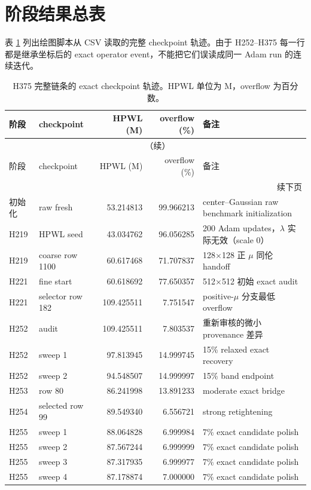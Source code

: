 \documentclass[UTF8,a4paper,11pt]{ctexrep}
\begin{document}
\section{阶段结果总表}
表 \ref{tab:trajectory} 列出绘图脚本从 CSV 读取的完整 checkpoint 轨迹。由于 H252--H375
每一行都是继承坐标后的 exact operator event，不能把它们误读成同一 Adam run 的连续迭代。

\begin{longtable}{p{1.35cm}p{2.45cm}r r p{5.6cm}}
\caption{H375 完整链条的 exact checkpoint 轨迹。HPWL 单位为 M，overflow 为百分数。}\label{tab:trajectory}\\
\toprule
阶段 & checkpoint & HPWL (M) & overflow (\%) & 备注\\
\midrule
\endfirsthead
\multicolumn{5}{c}{\tablename\ \thetable{}（续）}\\
\toprule
阶段 & checkpoint & HPWL (M) & overflow (\%) & 备注\\
\midrule
\endhead
\midrule
\multicolumn{5}{r}{续下页}\\
\endfoot
\bottomrule
\endlastfoot
初始化 & raw fresh & 53.214813 & 99.966213 & center--Gaussian raw benchmark initialization\\
H219 & HPWL seed & 43.034762 & 96.056285 & 200 Adam updates，$\lambda$ 实际无效（scale 0）\\
H219 & coarse row 1100 & 60.617468 & 71.707837 & 128$\times$128 正 $\mu$ 同伦 handoff\\
H221 & fine start & 60.618692 & 77.650357 & 512$\times$512 初始 exact audit\\
H221 & selector row 182 & 109.425511 & 7.751547 & positive-$\mu$ 分支最低 overflow\\
H252 & audit & 109.425511 & 7.803537 & 重新审核的微小 provenance 差异\\
H252 & sweep 1 & 97.813945 & 14.999745 & 15\% relaxed exact recovery\\
H252 & sweep 2 & 94.548507 & 14.999997 & 15\% band endpoint\\
H253 & row 80 & 86.241998 & 13.891233 & moderate exact bridge\\
H254 & selected row 99 & 89.549340 & 6.556721 & strong retightening\\
H255 & sweep 1 & 88.064828 & 6.999984 & 7\% exact candidate polish\\
H255 & sweep 2 & 87.567244 & 6.999999 & 7\% exact candidate polish\\
H255 & sweep 3 & 87.317935 & 6.999977 & 7\% exact candidate polish\\
H255 & sweep 4 & 87.178874 & 7.000000 & 7\% exact candidate polish\\

\end{longtable}
\end{document}
